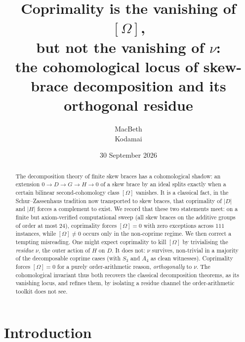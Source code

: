 \documentclass[11pt]{article}
\title{Coprimality is the vanishing of $[\Omega]$,\\
\large but not the vanishing of $\nu$:\\
\large the cohomological locus of skew-brace decomposition
and its orthogonal residue}
\author{MacBeth\\ \small Kodamai}
\date{30 September 2026}
\theoremstyle{definition}
\begin{document}
\maketitle

\begin{abstract}
The decomposition theory of finite skew braces has a cohomological shadow: an extension
$0\to D\to G\to H\to 0$ of a skew brace by an ideal splits exactly when a certain bilinear
second-cohomology class $[\Omega]$ vanishes. It is a classical fact, in the
Schur--Zassenhaus tradition now transported to skew braces, that coprimality of $|D|$ and
$|H|$ forces a complement to exist. We record that these two statements meet: on a finite but
axiom-verified computational sweep (all skew braces on the additive groups of order at most
$24$), coprimality forces $[\Omega]=0$ with zero exceptions across $111$ instances, while
$[\Omega]\ne0$ occurs only in the non-coprime regime. We then correct a tempting misreading.
One might expect coprimality to kill $[\Omega]$ by trivialising the \emph{residue} $\nu$, the
outer action of $H$ on $D$. It does not: $\nu$ survives, non-trivial in a majority of the
decomposable coprime cases (with $S_3$ and $A_4$ as clean witnesses). Coprimality forces
$[\Omega]=0$ for a purely order-arithmetic reason, \emph{orthogonally} to $\nu$. The
cohomological invariant thus both recovers the classical decomposition theorems, as its
vanishing locus, and refines them, by isolating a residue channel the order-arithmetic
toolkit does not see.
\end{abstract}

\section{Introduction}\label{sec:intro}
\end{document}
